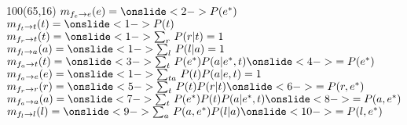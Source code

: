 \documentclass[shownotes,aspectratio=169]{beamer}
\begin{document}
\begin{frame}[plain]
\begin{textblock}{100}(65,16)
 $m_{f_e\rightarrow e}(e) = \onslide<2->{P(e^*)} $  \\
 $m_{f_t\rightarrow t}(t) = \onslide<1->{P(t)}$  \\
 $m_{f_r\rightarrow t}(t) = \onslide<1->{\sum_r \, P(r|t) = 1}$  \\
 $m_{f_l\rightarrow a}(a) = \onslide<1->{\sum_l \, P(l|a) = 1} $  \\
 $m_{f_a\rightarrow t}(t) = \onslide<3->{\sum_{t} \, P(e^*) P(a|e^*,t)} \onslide<4->{= P(e^*)}$  \\
 $m_{f_a\rightarrow e}(e) = \onslide<1->{\sum_{ta} \, P(t) P(a|e,t) = 1}$  \\
 $m_{f_r\rightarrow r}(r) = \onslide<5->{\sum_{t} \, P(t) P(r|t)} \onslide<6->{= P(r,e^*)}$ \\
 $m_{f_a\rightarrow a}(a) = \onslide<7->{\sum_{t} \, P(e^*)P(t)P(a|e^*,t)}\onslide<8->{  = P(a,e^*)}$  \\
 $m_{f_l\rightarrow l}(l) = \onslide<9->{\sum_{a} \, P(a,e^*) P(l|a)} \onslide<10->{ = P(l,e^*)}$
 \end{textblock}

 





 
\end{frame}
\end{document}
